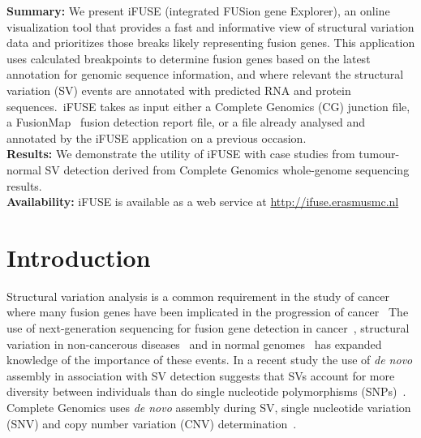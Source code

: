 \textbf{Summary:} We present iFUSE (integrated FUSion gene Explorer), an online visualization tool that provides a fast and informative view of structural variation data and prioritizes those breaks likely representing fusion genes. \color{black} This application uses calculated breakpoints to determine fusion genes based on the latest annotation for genomic sequence information, and where relevant the structural variation (SV) events are annotated with predicted RNA and protein sequences.\ iFUSE takes as input either a Complete Genomics (CG) junction file, a FusionMap~\cite{ge2011fusionmap} fusion detection report file, or a file already analysed and annotated by the iFUSE application on a previous occasion. \\
\textbf{Results:} We demonstrate the utility of iFUSE with case studies from tumour-normal SV detection derived from Complete Genomics whole-genome sequencing results. \\
\textbf{Availability:} iFUSE is available as a web service at \url{http://ifuse.erasmusmc.nl}


\section*{Introduction}

Structural variation analysis is a common requirement in the study of cancer where many fusion genes have been implicated in the progression of cancer~\cite{mitelman2007impact, kumar2008recurrent}
The use of next-generation sequencing for fusion gene detection in cancer~\cite{edgren2011identification, ge2011fusionmap, mcpherson2011defuse}, structural variation in non-cancerous diseases~\cite{sanders2011multiple, levy2011rare} and in normal genomes~\cite{10002010map} has expanded knowledge of the importance of these events.
In a recent study the use of \textit{de novo} assembly in association with SV detection suggests that SVs account for more diversity between individuals than do single nucleotide polymorphisms (SNPs)~\cite{li2011structural}. Complete Genomics uses \textit{de novo} assembly during SV, single nucleotide variation (SNV) and copy number variation (CNV) determination~\cite{carnevali2012computational}.

